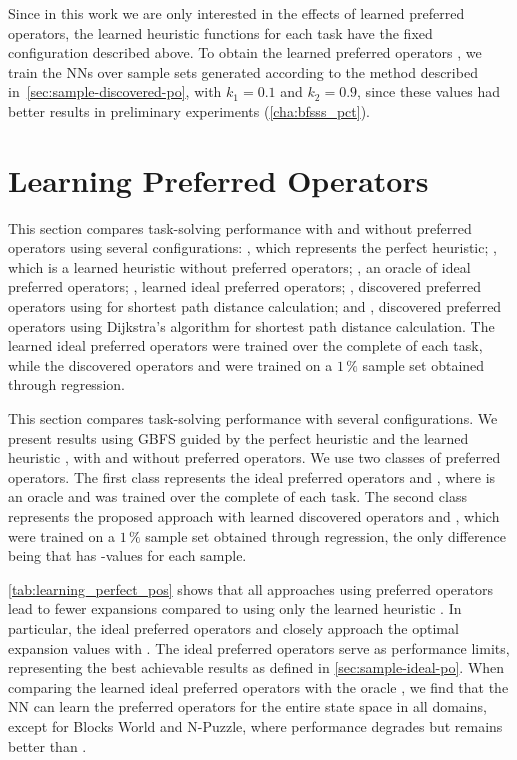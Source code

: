 \documentclass[ppgc,diss,english]{iiufrgs}
\begin{document}
Since in this work we are only interested in the effects of learned preferred operators, the learned heuristic functions \hnn for each task have the fixed configuration described above. To obtain the learned preferred operators \pog, we train the NNs over sample sets generated according to the method described in~\cref{sec:sample-discovered-po}, with $k_1 = 0.1$ and $k_2 = 0.9$, since these values had better results in preliminary experiments (\vref{cha:bfsss_pct}).

\section{Learning Preferred Operators}
\label{sec:exp-learning-po}
This section compares task-solving performance with and without preferred operators using several configurations: \hstar, which represents the perfect heuristic; \hnn, which is a learned heuristic without preferred operators; \postartable, an oracle of ideal preferred operators; \postar, learned ideal preferred operators; \pogstar, discovered preferred operators using \hstar for shortest path distance calculation; and \pog, discovered preferred operators using Dijkstra's algorithm for shortest path distance calculation. The learned ideal preferred operators \postar were trained over the complete \fsp of each task, while the discovered operators \pogstar and \pog were trained on a $1\,\%$ sample set obtained through regression.


This section compares task-solving performance with several configurations. We present results using GBFS guided by the perfect heuristic \hstar and the learned heuristic \hnn, with and without preferred operators. We use two classes of preferred operators. The first class represents the ideal preferred operators \postartable and \postar, where \postartable is an oracle and \postar was trained over the complete \fsp of each task. The second class represents the proposed approach with learned discovered operators \pogstar and \pog, which were trained on a $1\,\%$ sample set obtained through regression, the only difference being that \pogstar has \hstar-values for each sample.



\cref{tab:learning_perfect_pos} shows that all approaches using preferred operators lead to fewer expansions compared to using only the learned heuristic \hnn. In particular, the ideal preferred operators \postartable and \postar closely approach the optimal expansion values with \hstar.
The ideal preferred operators serve as performance limits, representing the best achievable results as defined in \cref{sec:sample-ideal-po}. When comparing the learned ideal preferred operators \postar with the oracle \postartable, we find that the NN can learn the preferred operators for the entire state space in all domains, except for Blocks World and N-Puzzle, where performance degrades but remains better than \hnn.
\end{document}
